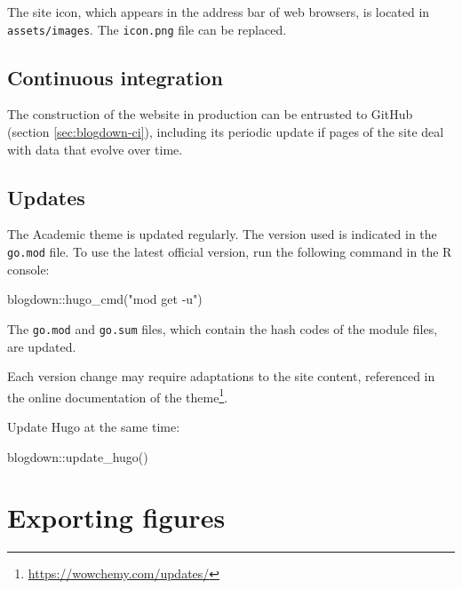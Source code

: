 \documentclass[
  12pt,
  american,
  a4paper,
  extrafontsizes,onecolumn,openright
  ]{memoir}
\newenvironment{Shaded}{\begin{snugshade}}{\end{snugshade}}
\newcommand{\FunctionTok}[1]{\textcolor[rgb]{0.00,0.00,0.00}{#1}}
\newcommand{\NormalTok}[1]{#1}
\newcommand{\SpecialCharTok}[1]{\textcolor[rgb]{0.00,0.00,0.00}{#1}}
\newcommand{\StringTok}[1]{\textcolor[rgb]{0.31,0.60,0.02}{#1}}
\begin{document}
The site icon, which appears in the address bar of web browsers, is located in \texttt{assets/images}.
The \texttt{icon.png} file can be replaced.

\hypertarget{sec:rediger-web-ci}{%
\subsection{Continuous integration}\label{sec:rediger-web-ci}}

The construction of the website in production can be entrusted to GitHub (section \ref{sec:blogdown-ci}), including its periodic update if pages of the site deal with data that evolve over time.

\hypertarget{updates-1}{%
\subsection{Updates}\label{updates-1}}

The Academic theme is updated regularly.
The version used is indicated in the \texttt{go.mod} file.
To use the latest official version, run the following command in the R console:

\scriptsize

\begin{Shaded}
\begin{Highlighting}[]
\NormalTok{blogdown}\SpecialCharTok{::}\FunctionTok{hugo\_cmd}\NormalTok{(}\StringTok{"mod get {-}u"}\NormalTok{)}
\end{Highlighting}
\end{Shaded}

\normalsize

The \texttt{go.mod} and \texttt{go.sum} files, which contain the hash codes of the module files, are updated.

Each version change may require adaptations to the site content, referenced in the online documentation of the theme\footnote{\url{https://wowchemy.com/updates/}}.

Update Hugo at the same time:

\scriptsize

\begin{Shaded}
\begin{Highlighting}[]
\NormalTok{blogdown}\SpecialCharTok{::}\FunctionTok{update\_hugo}\NormalTok{()}
\end{Highlighting}
\end{Shaded}

\normalsize

\hypertarget{exporting-figures}{%
\section{Exporting figures}\label{exporting-figures}}
\end{document}
